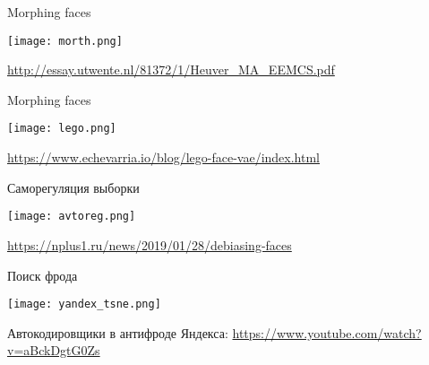 \documentclass[notes,12pt, aspectratio=169]{beamer}
\begin{document}
\begin{frame}{Morphing faces}
	\begin{center}
		\texttt{[image: morth.png]}
	\end{center}
	\vfill
	\footnotesize
	{\color{blue} \url{http://essay.utwente.nl/81372/1/Heuver_MA_EEMCS.pdf}  } 
\end{frame}


\begin{frame}{Morphing faces}
	\begin{center}
		\texttt{[image: lego.png]}
	\end{center}
	\vfill
	\footnotesize
	{\color{blue} \url{https://www.echevarria.io/blog/lego-face-vae/index.html}  } 
\end{frame}


\begin{frame}{Саморегуляция выборки}
	\begin{center}
		\texttt{[image: avtoreg.png]}
	\end{center}
	\vfill
	\footnotesize
	{\color{blue} \url{https://nplus1.ru/news/2019/01/28/debiasing-faces}  } 
\end{frame}


\begin{frame}{Поиск фрода}
	\begin{center}
		\texttt{[image: yandex\_tsne.png]}
	\end{center}
	\vfill
	\footnotesize
	Автокодировщики в антифроде Яндекса: {\color{blue} \url{https://www.youtube.com/watch?v=aBckDgtG0Zs}  } 
\end{frame}
\end{document}
